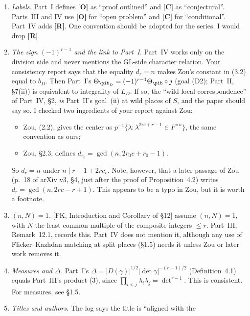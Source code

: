 \documentclass[11pt]{article}
\theoremstyle{definition}
\begin{document}
\begin{enumerate}[label=(\arabic*)]
corresponding genuine $\tilde\theta$''. Part~III goes the other way:
it fixes $\tilde\theta$ and puts $\theta(a)=\tilde\theta(a^*)$. Since
$\theta=\tilde\theta^{\,n}$ on lifts, $\theta$ does not determine
$\tilde\theta$. Fix $\tilde\theta$ first, and write
$L_D^{(\tilde\theta)}$ where it matters.
\item \emph{Labels.} Part~I defines \textbf{[O]} as ``proof outlined'' and
\textbf{[C]} as ``conjectural''. Parts~III and IV use \textbf{[O]} for
``open problem'' and \textbf{[C]} for ``conditional''. Part~IV adds
\textbf{[R]}. One convention should be adopted for the series. I would
drop \textbf{[R]}.
\item \emph{The sign $(-1)^{r-1}$ and the link to Part~I.} Part~IV works
only on the division side and never mentions the GL-side character
relation. Your consistency report says that the equality $d_r=n$ makes
Zou's constant in (3.2) equal to $b_D$. Then Part~I's
$\Theta_{\pib_D}=(-1)^{r-1}\Theta_{\pib}\circ\jmath$ (goal (D2); Part~II,
\S7(ii)) is equivalent to integrality of $L_D$. If so, the
``wild local correspondence'' of Part~IV, \S2, \emph{is} Part~II's goal~(ii)
at wild places of $S$, and the paper should say so. I checked two
ingredients of your report against Zou:
\begin{itemize}
\item Zou, (2.2), gives the center as
$p^{-1}\{\lambda:\lambda^{2rc+r-1}\in F^{\times n}\}$, the same
convention as ours;
\item Zou, \S2.3, defines $d_{r_0}=\gcd(n,2r_0c+r_0-1)$.
\end{itemize}
So $d_r=n$ under $n\mid r-1+2rc_v$. Note, however, that a later passage
of Zou (p.~18 of arXiv v3, \S4, just after the proof of Proposition~4.2)
writes $d_r=\gcd(n,2rc-r+1)$. This appears to be a typo in Zou, but it is
worth a footnote.
\item \emph{$(n,N)=1$.} [FK, Introduction and Corollary of \S12] assume
$(n,N)=1$, with $N$ the least common multiple of the composite integers
$\le r$. Part~III, Remark~12.1, records this. Part~IV does not mention
it, although any use of Flicker--Kazhdan matching at split places
(\S1.5) needs it unless Zou or later work removes it.
\item \emph{Measures and $\Delta$.} Part~I's
$\Delta=|D(\gamma)|^{1/2}|\det\gamma|^{-(r-1)/2}$ (Definition~4.1) equals
Part~III's product (3), since $\prod_{i<j}\lambda_i\lambda_j=\det^{r-1}$.
This is consistent. For measures, see \S1.5.
\item \emph{Titles and authors.} The log says the title is ``aligned with the

\end{enumerate}
\end{document}
